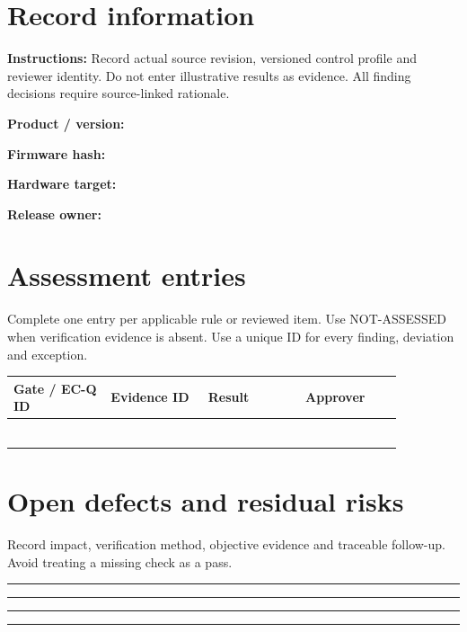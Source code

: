 \documentclass[10pt,letterpaper]{article}
\begin{document}
\makedoctitle
\makedocsummary
\section{Record information}
\textbf{Instructions:} Record actual source revision, versioned control profile and reviewer identity. Do not enter illustrative results as evidence. All finding decisions require source-linked rationale.\par\medskip
\noindent\textbf{Product / version:}\quad\hrulefill\par\vspace{11pt}
\noindent\textbf{Firmware hash:}\quad\hrulefill\par\vspace{11pt}
\noindent\textbf{Hardware target:}\quad\hrulefill\par\vspace{11pt}
\noindent\textbf{Release owner:}\quad\hrulefill\par\vspace{11pt}
\section{Assessment entries}
Complete one entry per applicable rule or reviewed item. Use NOT-ASSESSED when verification evidence is absent. Use a unique ID for every finding, deviation and exception.\par\medskip
\begin{longtable}{|p{0.215\linewidth}|p{0.215\linewidth}|p{0.215\linewidth}|p{0.215\linewidth}|}
\hline
\textbf{Gate / EC-Q ID} & \textbf{Evidence ID} & \textbf{Result} & \textbf{Approver}\\\hline
\endhead
\rule{0pt}{27pt} & & & \\\hline
\rule{0pt}{27pt} & & & \\\hline
\rule{0pt}{27pt} & & & \\\hline
\rule{0pt}{27pt} & & & \\\hline
\rule{0pt}{27pt} & & & \\\hline
\rule{0pt}{27pt} & & & \\\hline
\end{longtable}
\section{Open defects and residual risks}
Record impact, verification method, objective evidence and traceable follow-up. Avoid treating a missing check as a pass.\par\medskip
\noindent\rule{\linewidth}{0.4pt}\par\vspace{16pt}
\noindent\rule{\linewidth}{0.4pt}\par\vspace{16pt}
\noindent\rule{\linewidth}{0.4pt}\par\vspace{16pt}
\noindent\rule{\linewidth}{0.4pt}\par\vspace{16pt}
\end{document}
